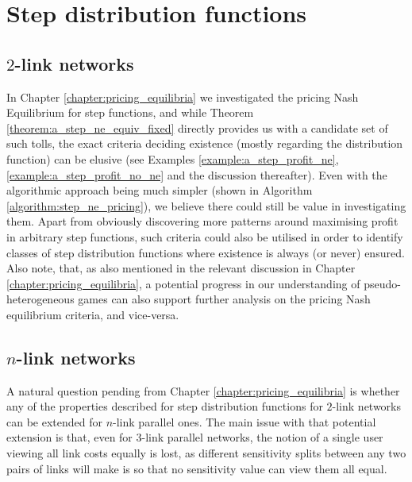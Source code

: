 \documentclass[10pt,a4paper]{book}
\theoremstyle{definition}
\theoremstyle{comment}
\begin{document}
\section*{Step distribution functions}

\subsection*{$2$-link networks}

In Chapter \ref{chapter:pricing_equilibria} we investigated the pricing Nash Equilibrium for step functions, and while Theorem \ref{theorem:a_step_ne_equiv_fixed} directly provides us with a candidate set of such tolls, the exact criteria deciding existence (mostly regarding the distribution function) can be elusive (see Examples \ref{example:a_step_profit_ne}, \ref{example:a_step_profit_no_ne} and the discussion thereafter).
Even with the algorithmic approach being much simpler (shown in Algorithm \ref{algorithm:step_ne_pricing}), we believe there could still be value in investigating them.
Apart from obviously discovering more patterns around maximising profit in arbitrary step functions, such criteria could also be utilised in order to identify classes of step distribution functions where existence is always (or never) ensured.
Also note, that, as also mentioned in the relevant discussion in Chapter \ref{chapter:pricing_equilibria}, a potential progress in our understanding of pseudo-heterogeneous games can also support further analysis on the pricing Nash equilibrium criteria, and vice-versa.

\subsection*{$n$-link networks}

A natural question pending from Chapter \ref{chapter:pricing_equilibria} is whether any of the properties described for step distribution functions for $2$-link networks can be extended for $n$-link parallel ones.
The main issue with that potential extension is that, even for $3$-link parallel networks, the notion of a single user viewing all link costs equally is lost, as different sensitivity splits between any two pairs of links will make is so that no sensitivity value can view them all equal.
\end{document}

